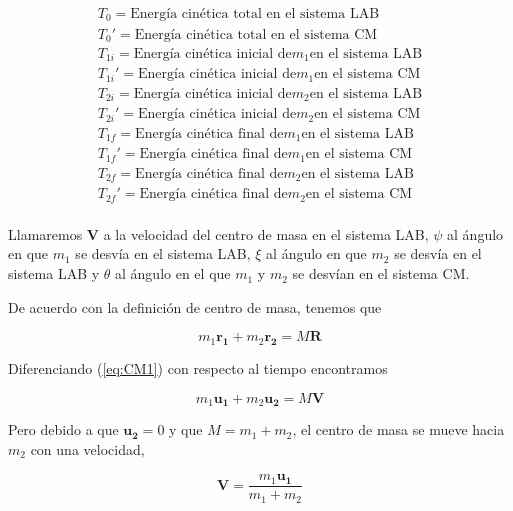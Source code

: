 \documentclass[a4paper,10pt]{article}
\begin{document}
 \begin{gather*}
  T_0 = \textrm{Energía cinética total en el sistema LAB} \\
  T_0' = \textrm{Energía cinética total en el sistema CM} \\
%  
%  
   T_{1i} = \textrm{Energía cinética inicial de} m_1 \textrm{en el sistema LAB} \\
   T_{1i}' = \textrm{Energía cinética inicial de} m_1 \textrm{en el sistema CM} \\
%   
   T_{2i} = \textrm{Energía cinética inicial de} m_2 \textrm{en el sistema LAB} \\
   T_{2i}' = \textrm{Energía cinética inicial de} m_2 \textrm{en el sistema CM} \\
%  
  T_{1f} = \textrm{Energía cinética final de} m_1 \textrm{en el sistema LAB} \\
  T_{1f}' = \textrm{Energía cinética final de} m_1 \textrm{en el sistema CM} \\
%  
  T_{2f} = \textrm{Energía cinética final de} m_2 \textrm{en el sistema LAB} \\
  T_{2f}' = \textrm{Energía cinética final de} m_2 \textrm{en el sistema CM} \\
%
\label{eq:energiasCineticas}
  \end{gather*}

Llamaremos $\textbf{V}$ a la velocidad del centro de masa en el sistema LAB, $\psi$ al 
ángulo en que $m_1$ se desvía en el sistema LAB, $\xi$ al ángulo en que $m_2$ se desvía
en el sistema LAB y $\theta$ al ángulo en el que $m_1$ y $m_2$ se desvían en el sistema CM.

De acuerdo con la definición de centro de masa, tenemos que

\begin{equation}
 m_1 \mathbf{r_1} + m_2 \mathbf{r_2} = M\mathbf{R}
 \label{eq:CM1}
\end{equation}

Diferenciando (\ref{eq:CM1}) con respecto al tiempo encontramos

\begin{equation}
 m_1 \mathbf{u_1} + m_2 \mathbf{u_2} = M\mathbf{V}
 \label{eq:CMVel1}
\end{equation}

Pero debido a que $\mathbf{u_2}=0$ y que $M=m_1+m_2$, el centro de masa se mueve
hacia $m_2$ con una velocidad,

\begin{equation}
\mathbf{V} = \frac{m_1 \mathbf{u_1}}{m_1+m_2}
 \label{eq:CMVel2}
\end{equation}
\end{document}
